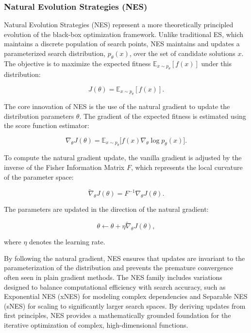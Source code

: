 \subsubsection{Natural Evolution Strategies (NES)}

Natural Evolution Strategies (NES) \citep{wierstra2014nes} represent a more theoretically principled evolution of the black-box optimization framework. Unlike traditional ES, which maintains a discrete population of search points, NES maintains and updates a parameterized search distribution, $p_\theta(x)$, over the set of candidate solutions $x$. The objective is to maximize the expected fitness $\mathbb{E}_{x \sim p_\theta}[f(x)]$ under this distribution:

\begin{equation}
J(\theta) = \mathbb{E}_{x \sim p_\theta}[f(x)].
\end{equation}

The core innovation of NES is the use of the natural gradient to update the distribution parameters $\theta$. The gradient of the expected fitness is estimated using the score function estimator:

\begin{equation}
\nabla_\theta J(\theta) = \mathbb{E}_{x \sim p_\theta} \big[ f(x)\nabla_\theta \log p_\theta(x) \big].
\end{equation}

To compute the natural gradient update, the vanilla gradient is adjusted by the inverse of the Fisher Information Matrix $F$, which represents the local curvature of the parameter space:

\begin{equation}
\tilde{\nabla}_\theta J(\theta) = F^{-1} \nabla_\theta J(\theta).
\end{equation}

The parameters are updated in the direction of the natural gradient:

\begin{equation}
\theta \leftarrow \theta + \eta \tilde{\nabla}_\theta J(\theta),
\end{equation}

where $\eta$ denotes the learning rate.

By following the natural gradient, NES ensures that updates are invariant to the parameterization of the distribution and prevents the premature convergence often seen in plain gradient methods. The NES family includes variations designed to balance computational efficiency with search accuracy, such as Exponential NES (xNES) for modeling complex dependencies and Separable NES (sNES) for scaling to significantly larger search spaces. By deriving updates from first principles, NES provides a mathematically grounded foundation for the iterative optimization of complex, high-dimensional functions.

